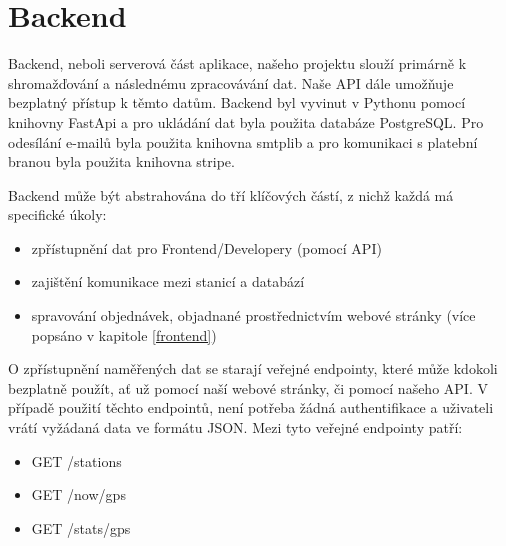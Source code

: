 \section{Backend}
Backend, neboli serverová část aplikace, našeho projektu slouží primárně k shromažďování a následnému zpracovávání dat. Naše API dále umožňuje bezplatný přístup k těmto datům.
Backend byl vyvinut v Pythonu pomocí knihovny FastApi a pro ukládání dat byla použita databáze PostgreSQL.
Pro odesílání e-mailů byla použita knihovna smtplib a pro komunikaci s platební branou byla použita knihovna stripe. 

Backend může být abstrahována do tří klíčových částí, z nichž každá má specifické úkoly: 
\begin{itemize}
  \item zpřístupnění dat pro Frontend/Developery (pomocí API) 
  \item zajištění komunikace mezi stanicí a databází 
  \item spravování objednávek, objadnané prostřednictvím webové stránky (více popsáno v kapitole \ref{frontend})  
\end{itemize}

O zpřístupnění naměřených dat se starají veřejné endpointy, které může kdokoli bezplatně použít, ať už pomocí naší webové stránky, či pomocí našeho API. 
V případě použití těchto endpointů, není potřeba žádná authentifikace a uživateli vrátí vyžádaná data ve formátu JSON. Mezi tyto veřejné endpointy patří:
\begin{itemize}
  \item GET /stations
  \item GET /now/{gps} 
  \item GET /stats/{gps}
\end{itemize}

